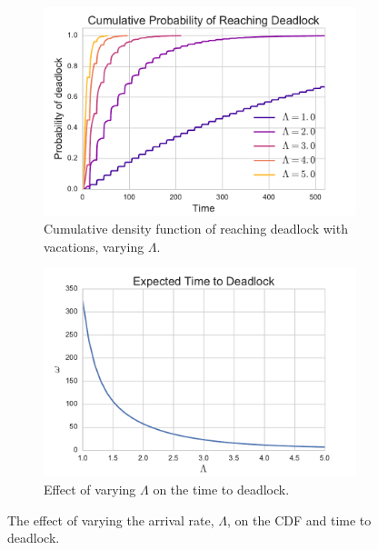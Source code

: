 \documentclass{article}
\begin{document}
\begin{figure}[!hbtp]
\begin{center}
\begin{subfigure}[b]{0.45\textwidth}
    \includegraphics[width=\textwidth]{img/cdf_vary_L.pdf}
    \caption{Cumulative density function of reaching deadlock with vacations, varying $\Lambda$.}
    \label{fig:cdf_varyL}
\end{subfigure}
\begin{subfigure}[b]{0.45\textwidth}
    \includegraphics[width=\textwidth]{img/ttd_vary_L.pdf}
    \caption{Effect of varying $\Lambda$ on the time to deadlock.}
    \label{fig:ttd_varyL}
\end{subfigure}
\end{center}
\caption{The effect of varying the arrival rate, $\Lambda$, on the CDF and time to deadlock.}
\label{fig:ttdcdf_varyL}
\end{figure}
\end{document}
